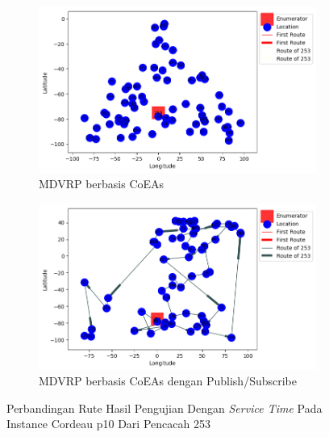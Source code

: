 \begin{figure}[H]
	\centering
	\begin{subfigure}[t]{\textwidth}
		\centering
		\includegraphics[width=\textwidth]{Resources/Images/cordeau_p10_tw/cordeau_p10_tw_253_coes}
		\caption{MDVRP berbasis CoEAs}
		\label{fig:cordeau_p10_tw_253_coes}
	\end{subfigure}
	\begin{subfigure}[t]{\textwidth}
		\centering
		\includegraphics[width=\textwidth]{Resources/Images/cordeau_p10_tw/cordeau_p10_tw_253_pubsub_coes}
		\caption{MDVRP berbasis CoEAs dengan Publish/Subscribe}
		\label{fig:cordeau_p10_tw_253_pubsub_coes}
	\end{subfigure}
	\caption{Perbandingan Rute Hasil Pengujian Dengan \textit{Service Time} Pada Instance Cordeau p10 Dari Pencacah 253}
	\label{fig:cordeau_p10_tw_253}
\end{figure}